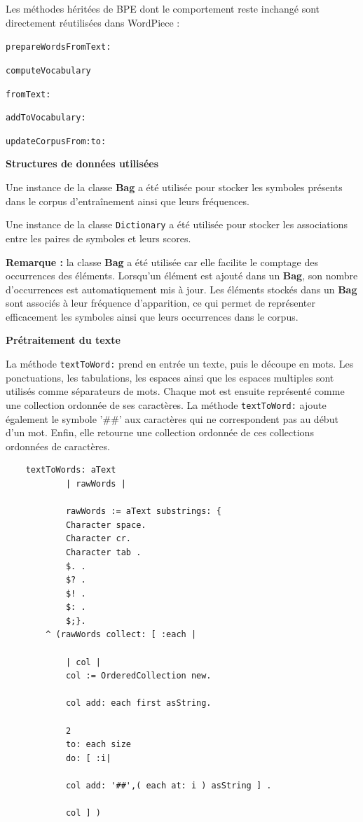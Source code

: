 \documentclass[12pt,a4paper]{report}
\begin{document}
	Les méthodes héritées de BPE dont le comportement reste inchangé sont directement réutilisées dans WordPiece :
	
	\begin{itemizeFB}
		
		\item \texttt{prepareWordsFromText:}
		\item \texttt{computeVocabulary}
		\item \texttt{fromText:}
		\item \texttt{addToVocabulary:}
		\item \texttt{updateCorpusFrom:to:}
		
	\end{itemizeFB}
	
	\textbf{Structures de données utilisées}

	\begin{itemizeFB}
		\item Une instance de la classe \textbf{Bag} a été utilisée pour stocker les symboles présents dans le corpus d’entraînement ainsi que leurs fréquences.
		\item Une instance de la classe \texttt{Dictionary} a été utilisée pour stocker les associations entre les paires de symboles et leurs scores.
	\end{itemizeFB}

	\textbf{Remarque :} la classe \textbf{Bag} a été utilisée car elle facilite le comptage des occurrences des éléments. Lorsqu’un élément est ajouté dans un \textbf{Bag}, son nombre d’occurrences est automatiquement mis à jour.
	Les éléments stockés dans un \textbf{Bag} sont associés à leur fréquence d’apparition, ce qui permet de représenter efficacement les symboles ainsi que leurs occurrences dans le corpus.
	
	\textbf{Prétraitement du texte}
	
	La méthode \texttt{textToWord:} prend en entrée un texte, puis le découpe en mots. Les ponctuations, les tabulations, les espaces ainsi que les espaces multiples sont utilisés comme séparateurs de mots. Chaque mot est ensuite représenté comme une collection ordonnée de ses caractères. La méthode \texttt{textToWord:} ajoute également le symbole '\#\#' aux caractères qui ne correspondent pas au début d’un mot. Enfin, elle retourne une collection ordonnée de ces collections ordonnées de caractères.
	
	\begin{verbatim}
	textToWords: aText
			| rawWords |
			
			rawWords := aText substrings: {
			Character space.
			Character cr.
			Character tab .
			$. .
			$? .
			$! .
			$: .
			$;}.	
		^ (rawWords collect: [ :each |
		
			| col |
			col := OrderedCollection new.
			
			col add: each first asString.
			
			2 
			to: each size
			do: [ :i|
			
			col add: '##',( each at: i ) asString ] .
			
			col ] )
	\end{verbatim}
	
\end{document}
